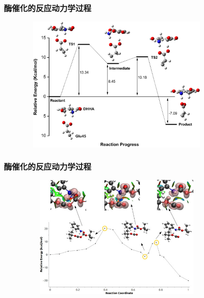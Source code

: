 \frame
{
	\frametitle{酶催化的反应动力学过程}
\begin{figure}[h!]
\centering
\vspace{-10.5pt}
\includegraphics[height=2.70in,width=4.00in,viewport=0 0 500 370,clip]{Figures/Catalyst-reaction-path.png}
\label{enzyem-reaction-path-1}
\end{figure}
}

\frame
{
	\frametitle{酶催化的反应动力学过程}
\begin{figure}[h!]
\centering
\vspace{-5.5pt}
\includegraphics[height=2.45in,width=4.00in,viewport=0 0 180 135,clip]{Figures/molecules-reaction-path.jpg}
\label{enzyem-reaction-path-2}
\end{figure}
}

%
